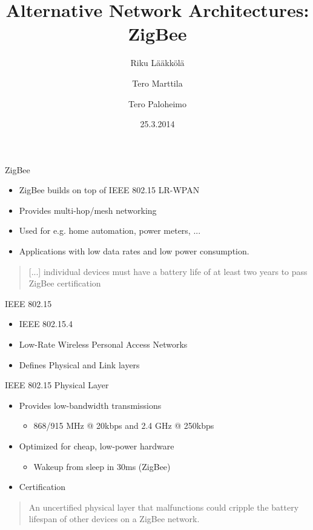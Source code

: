 \documentclass{beamer}
\title[ZigBee]{Alternative Network Architectures: ZigBee}
\author{Riku Lääkkölä \and Tero Marttila \and Tero Paloheimo}
\institute{Aalto ELEC}
\date{25.3.2014}
\begin{document}
\begin{frame}
  	\titlepage
\end{frame}


\begin{frame}{ZigBee}
  \begin{itemize}
    \item ZigBee builds on top of IEEE 802.15 LR-WPAN
    \item Provides multi-hop/mesh networking
    \item Used for e.g. home automation, power meters, ...
    \item Applications with low data rates and low power consumption.
  \end{itemize}
  \begin{quotation}
  [...] individual devices must have a battery life of at least two years to pass ZigBee certification
  \end{quotation}
\end{frame}

\begin{frame}{IEEE 802.15}
  \begin{itemize}
  	\item IEEE 802.15.4
  	\item Low-Rate Wireless Personal Access Networks
	\item Defines Physical and Link layers
  	
  \end{itemize}
\end{frame}

\begin{frame}{IEEE 802.15 Physical Layer}
  \begin{itemize}
  	\item Provides low-bandwidth transmissions
  	\begin{itemize}
  		\item 868/915 MHz @ 20kbps and 2.4 GHz @ 250kbps
  	\end{itemize}
  	\item Optimized for cheap, low-power hardware
  	\begin{itemize}
    	\item Wakeup from sleep in 30ms (ZigBee)
  	\end{itemize}
  	\item Certification 
  \end{itemize}
  \begin{quotation}
  	An uncertified physical layer that malfunctions could cripple the battery lifespan of other devices on a ZigBee network.
  \end{quotation}
\end{frame}
\end{document}
